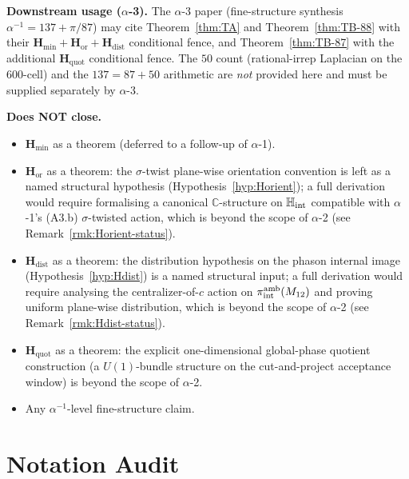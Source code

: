 \documentclass[11pt, a4paper]{amsart}
\theoremstyle{definition}
\newcommand{\C}{\mathbb{C}}
\newcommand{\HH}{\mathbb{H}}
\newcommand{\Hmin}{\mathbf{H}_{\min}}
\newcommand{\Hor}{\mathbf{H}_{\mathrm{or}}}
\newcommand{\Hdist}{\mathbf{H}_{\mathrm{dist}}}
\newcommand{\Hquot}{\mathbf{H}_{\mathrm{quot}}}
\newcommand{\Mtw}{M_{12}}
\begin{document}
\textbf{Downstream usage ($\alpha$-3).} The $\alpha$-3 paper
(fine-structure synthesis $\alpha^{-1} = 137 + \pi/87$) may
cite Theorem~\ref{thm:TA} and Theorem~\ref{thm:TB-88} with
their $\Hmin + \Hor + \Hdist$ conditional fence, and
Theorem~\ref{thm:TB-87} with the additional $\Hquot$
conditional fence. The $50$ count (rational-irrep Laplacian
on the $600$-cell) and the $137 = 87 + 50$ arithmetic are
\emph{not} provided here and must be supplied separately
by $\alpha$-3.

\textbf{Does NOT close.}
\begin{itemize}
\item $\Hmin$ as a theorem (deferred to a follow-up of
  $\alpha$-1).
\item $\Hor$ as a theorem: the $\sigma$-twist plane-wise
  orientation convention is left as a named structural
  hypothesis (Hypothesis~\ref{hyp:Horient}); a full derivation
  would require formalising a canonical $\C$-structure on
  $\HH_{\rm int}$ compatible with $\alpha$-1's (A3.b)
  $\sigma$-twisted action, which is beyond the scope of
  $\alpha$-2 (see Remark~\ref{rmk:Horient-status}).
\item $\Hdist$ as a theorem: the distribution hypothesis on
  the phason internal image (Hypothesis~\ref{hyp:Hdist})
  is a named structural input; a full derivation would
  require analysing the centralizer-of-$c$ action on
  $\pi_{\rm int}^{\rm amb}(\Mtw)$ and proving uniform
  plane-wise distribution, which is beyond the scope of
  $\alpha$-2 (see Remark~\ref{rmk:Hdist-status}).
\item $\Hquot$ as a theorem: the explicit one-dimensional
  global-phase quotient construction (a $U(1)$-bundle
  structure on the cut-and-project acceptance window) is
  beyond the scope of $\alpha$-2.
\item Any $\alpha^{-1}$-level fine-structure claim.
\end{itemize}

\section{Notation Audit}
\label{sec:notation}
\end{document}
